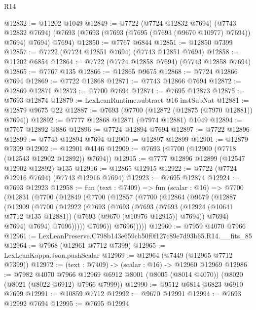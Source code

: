 \begin{lexlean}{R14}
\begin{coremodule}
@12832 := @11202 @1049
@12849 := @7722
    (@7724 @12832 @7694)
    (@7743 @12832 @7694)
    (@7693 (@7693 (@7693 (@7695 (@7693 (@9670 @10977) @7694)) @7694) @7694) @7694)
@12850 := @7767 @6844
@12851 := @12850 @7399
@12857 := @7722 (@7724 @12851 @7694) (@7743 @12851 @7694)
@12858 := @11202 @6854
@12864 := @7722 (@7724 @12858 @7694) (@7743 @12858 @7694)
@12865 := @7767 @135
@12866 := @12865 @9675
@12868 := @7724 @12866 @7694
@12869 := @7722 @12868
@12871 := @7743 @12866 @7694
@12872 := @12869 @12871
@12873 := @7700 @7694
@12874 := @7695 @12873
@12875 := @7693 @12874
@12879 := LexLeanRuntime.subtract @16 instSubNat
@12881 := @12879 @9675 @22
@12887 := @7693 (@7700 (@12872 (@12875 (@7970 @12881)) @7694))
@12892 := @7777 @12868 @12871 (@7974 @12881) @1049
@12894 := @7767 @12892 @886
@12896 := @7724 @12894 @7694
@12897 := @7722 @12896
@12899 := @7743 @12894 @7694
@12900 := @12897 @12899
@12901 := @12879 @7399
@12902 := @12901 @4146
@12909 := @7693 (@7700 (@12900 (@7718 (@12543 @12902 @12892)) @7694))
@12915 := @7777 @12896 @12899 (@12547 @12902 @12892) @135
@12916 := @12865 @12915
@12922 := @7722 (@7724 @12916 @7694) (@7743 @12916 @7694)
@12923 := @7695 @12874
@12924 := @7693 @12923
@12958 := fun (text : @7409) =>
  fun (scalar : @16) =>
  @7700
    (@12831
      (@7700
        (@12849
          (@7700
            (@12857
              (@7700
                (@12864
                  (@9679
                    (@12887
                      (@12909
                        (@7700
                          (@12922
                            (@7693
                              (@7693
                                (@7693
                                  (@7693
                                    (@12924 (@10641 @7712 @135 @12881))
                                    (@7693 (@9670 (@10976 @12915)) @7694))
                                  @7694)
                                @7694)
                              @7694)
                            @7696)))))
                  @7696))
              @7696)))))
@12960 := @7959 @4070 @7966
@12961 := LexLeanPreserve.C798b143e659cb50f0f127c89e7d93b65.R14.__fits_85
@12964 := @7968 (@12961 @7712 @7399)
@12965 := LexLeanKappa.Json.pushScalar
@12969 := @12964 (@7449 (@12965 @7712 @7399))
@12972 := (text : @7409) -> (scalar : @16) -> @12960 @12969
@12986 := @7982
    @4070
    @7966
    @12969
    @6912
    @8001
    (@8005 (@8014 @4070))
    (@8020 (@8021 (@8022 @6912) @7966 @7999))
@12990 := @9512 @6814 @6823 @6910 @7699
@12991 := @10859 @7712
@12992 := @9670 @12991
@12994 := @7693 @12992 @7694
@12995 := @7695 @12994

\end{coremodule}
\end{lexlean}
